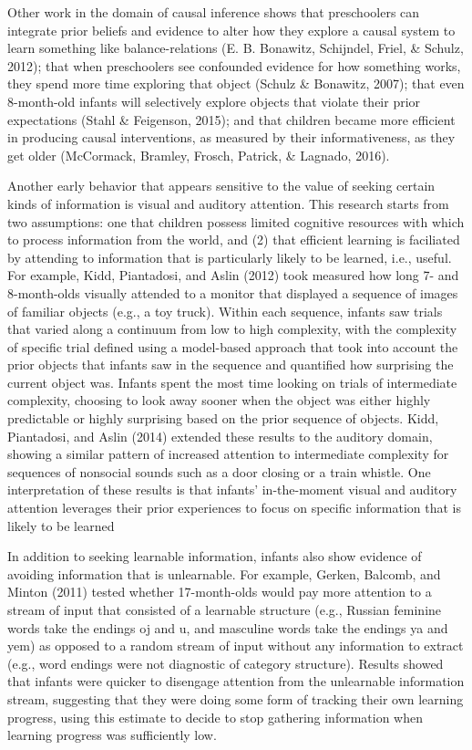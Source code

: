\documentclass[english,man]{apa6}
\theoremstyle{definition}
\theoremstyle{definition}
\theoremstyle{definition}
\theoremstyle{remark}
\begin{document}
Other work in the domain of causal inference shows that preschoolers can
integrate prior beliefs and evidence to alter how they explore a causal
system to learn something like balance-relations (E. B. Bonawitz,
Schijndel, Friel, \& Schulz, 2012); that when preschoolers see
confounded evidence for how something works, they spend more time
exploring that object (Schulz \& Bonawitz, 2007); that even 8-month-old
infants will selectively explore objects that violate their prior
expectations (Stahl \& Feigenson, 2015); and that children became more
efficient in producing causal interventions, as measured by their
informativeness, as they get older (McCormack, Bramley, Frosch, Patrick,
\& Lagnado, 2016).

Another early behavior that appears sensitive to the value of seeking
certain kinds of information is visual and auditory attention. This
research starts from two assumptions: one that children possess limited
cognitive resources with which to process information from the world,
and (2) that efficient learning is faciliated by attending to
information that is particularly likely to be learned, i.e., useful. For
example, Kidd, Piantadosi, and Aslin (2012) took measured how long 7-
and 8-month-olds visually attended to a monitor that displayed a
sequence of images of familiar objects (e.g., a toy truck). Within each
sequence, infants saw trials that varied along a continuum from low to
high complexity, with the complexity of specific trial defined using a
model-based approach that took into account the prior objects that
infants saw in the sequence and quantified how surprising the current
object was. Infants spent the most time looking on trials of
intermediate complexity, choosing to look away sooner when the object
was either highly predictable or highly surprising based on the prior
sequence of objects. Kidd, Piantadosi, and Aslin (2014) extended these
results to the auditory domain, showing a similar pattern of increased
attention to intermediate complexity for sequences of nonsocial sounds
such as a door closing or a train whistle. One interpretation of these
results is that infants' in-the-moment visual and auditory attention
leverages their prior experiences to focus on specific information that
is likely to be learned

In addition to seeking learnable information, infants also show evidence
of avoiding information that is unlearnable. For example, Gerken,
Balcomb, and Minton (2011) tested whether 17-month-olds would pay more
attention to a stream of input that consisted of a learnable structure
(e.g., Russian feminine words take the endings oj and u, and masculine
words take the endings ya and yem) as opposed to a random stream of
input without any information to extract (e.g., word endings were not
diagnostic of category structure). Results showed that infants were
quicker to disengage attention from the unlearnable information stream,
suggesting that they were doing some form of tracking their own learning
progress, using this estimate to decide to stop gathering information
when learning progress was sufficiently low.
\end{document}
